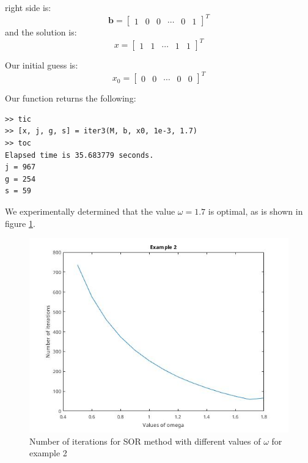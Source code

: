 \documentclass[]{article}
\begin{document}
right side is:
\begin{equation*}
	\mathbf{b} = \begin{bmatrix}
		1 & 0 & 0 & \cdots & 0 & 1
	\end{bmatrix}^T
\end{equation*}
and the solution is:
\begin{equation*}
	x = \begin{bmatrix}
		1 & 1 & \cdots & 1 & 1
	\end{bmatrix}^T
\end{equation*}

Our initial guess is:
\begin{equation*}
	x_0 = \begin{bmatrix}
		0 & 0 & \cdots & 0 & 0
	\end{bmatrix}^T
\end{equation*}

Our function returns the following:

\begin{lstlisting}
>> tic
>> [x, j, g, s] = iter3(M, b, x0, 1e-3, 1.7)
>> toc
Elapsed time is 35.683779 seconds.
j = 967
g = 254
s = 59
\end{lstlisting}

We experimentally determined that the value $\omega = 1.7$ is optimal, as is
shown in figure \ref{fig:2-omega}.

\begin{figure}
	\centering
	\includegraphics[width=\linewidth]{pics/test2-omega.jpg}
	\caption{Number of iterations for SOR method with different values of
		$\omega$ for example 2}
	\label{fig:2-omega}
\end{figure}
\end{document}
